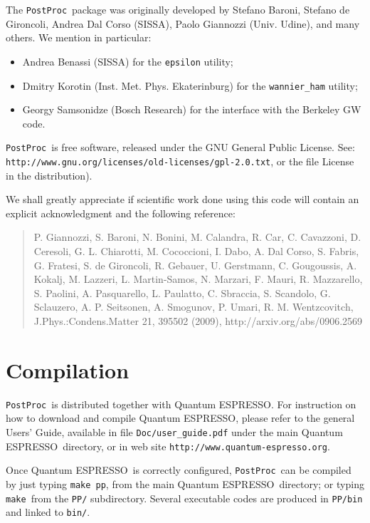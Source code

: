 \documentclass[12pt,a4paper]{article}
\def\qe{{\sc Quantum ESPRESSO}}
\def\PostProc{\texttt{PostProc}}
\def\make{\texttt{make}}
\begin{document}
The \PostProc\ package was originally developed by Stefano Baroni, 
Stefano de Gironcoli, Andrea Dal Corso (SISSA), Paolo Giannozzi 
(Univ. Udine), and many others. We mention in particular: 
\begin{itemize}
\item Andrea Benassi (SISSA) for the \texttt{epsilon} utility;
\item Dmitry Korotin (Inst. Met. Phys. Ekaterinburg) for the
\texttt{wannier\_ham} utility;
\item Georgy Samsonidze (Bosch Research) for the interface
      with the Berkeley GW code.
\end{itemize}

\PostProc\ is free software, released under the 
GNU General Public License. See:\\
\texttt{http://www.gnu.org/licenses/old-licenses/gpl-2.0.txt}, 
or the file License in the distribution).
    
We shall greatly appreciate if scientific work done using this code will 
contain an explicit acknowledgment and the following reference:
\begin{quote}
P. Giannozzi, S. Baroni, N. Bonini, M. Calandra, R. Car, C. Cavazzoni,
D. Ceresoli, G. L. Chiarotti, M. Cococcioni, I. Dabo, A. Dal Corso,
S. Fabris, G. Fratesi, S. de Gironcoli, R. Gebauer, U. Gerstmann,
C. Gougoussis, A. Kokalj, M. Lazzeri, L. Martin-Samos, N. Marzari,
F. Mauri, R. Mazzarello, S. Paolini, A. Pasquarello, L. Paulatto,
C. Sbraccia, S. Scandolo, G. Sclauzero, A. P. Seitsonen, A. Smogunov,
P. Umari, R. M. Wentzcovitch, J.Phys.:Condens.Matter 21, 395502 (2009),
http://arxiv.org/abs/0906.2569
\end{quote}
\section{Compilation}

\PostProc\ is distributed together with \qe.
For instruction on how to download and compile \qe, please refer 
to the general Users' Guide, available in file \texttt{Doc/user\_guide.pdf}
under the main \qe\ directory, or in web site 
\texttt{http://www.quantum-espresso.org}.

Once \qe\ is correctly configured, \PostProc\ can be compiled by
just typing \texttt{make pp}, from the main \qe\ directory;
or typing \make\ from the \texttt{PP/} subdirectory.
Several executable codes are produced in \texttt{PP/bin}
and linked to \texttt{bin/}.
\end{document}
